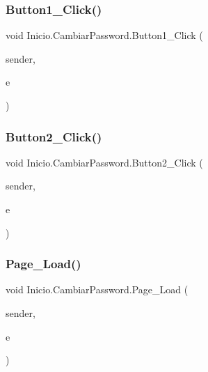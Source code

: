 \subsubsection{\texorpdfstring{Button1\_Click()}{Button1\_Click()}}
{\footnotesize\ttfamily void Inicio.\+Cambiar\+Password.\+Button1\+\_\+\+Click (\begin{DoxyParamCaption}\item[{object}]{sender,  }\item[{Event\+Args}]{e }\end{DoxyParamCaption})\hspace{0.3cm}{\ttfamily [protected]}}

\mbox{\label{classInicio_1_1CambiarPassword_aec4c171949c854275a9dd38e949cb62e}} 
\subsubsection{\texorpdfstring{Button2\_Click()}{Button2\_Click()}}
{\footnotesize\ttfamily void Inicio.\+Cambiar\+Password.\+Button2\+\_\+\+Click (\begin{DoxyParamCaption}\item[{object}]{sender,  }\item[{Event\+Args}]{e }\end{DoxyParamCaption})\hspace{0.3cm}{\ttfamily [protected]}}

\mbox{\label{classInicio_1_1CambiarPassword_a94a3066835d069fa7b90f66f6f526ac3}} 
\subsubsection{\texorpdfstring{Page\_Load()}{Page\_Load()}}
{\footnotesize\ttfamily void Inicio.\+Cambiar\+Password.\+Page\+\_\+\+Load (\begin{DoxyParamCaption}\item[{object}]{sender,  }\item[{Event\+Args}]{e }\end{DoxyParamCaption})\hspace{0.3cm}{\ttfamily [protected]}}

